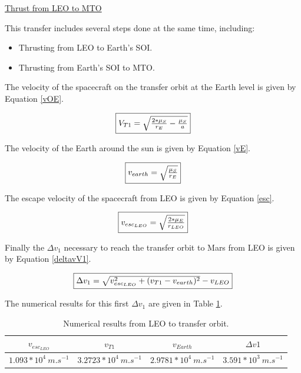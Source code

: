 \documentclass[a4paper, oneside, 11pt]{article}
\begin{document}
\medskip

\underline{Thrust from LEO to MTO}

\medskip

This transfer includes several steps done at the same time, including:
\begin{itemize}
\item Thrusting from LEO to Earth's SOI.
\item Thrusting from Earth's SOI to MTO.
\end{itemize}

The velocity of the spacecraft on the transfer orbit at the Earth level is given by Equation \ref{vOE}.
 
\begin{equation}
\label{vOE}
\fbox{$V_{T1}=\sqrt{\frac{2*\mu_S}{r_E}-\frac{\mu_S}{a}}$}
\end{equation}

The velocity of the Earth around the sun is given by Equation \ref{vE}. 

\begin{equation}
\label{vE}
\fbox{$v_{earth}= \sqrt{\frac{\mu_S}{r_{E}}}$}
\end{equation}

The escape velocity of the spacecraft from LEO is given by Equation \ref{esc}.

\begin{equation}
\label{esc}
\fbox{$v_{esc_{LEO}}= \sqrt{\frac{2*\mu_E}{r_{LEO}}}$}
\end{equation}

Finally the $\Delta v_1$ necessary to reach the transfer orbit to Mars from LEO is given by Equation \ref{deltavV1}.

\begin{equation}
\label{deltavV1}
\fbox{$\Delta v_1= \sqrt{v_{esc_{LEO}}^2+(v_{T1}-v_{earth})^2}-v_{LEO}$}
\end{equation}

The numerical results for this first $\Delta v_1$ are given in Table \ref{deltaV1Tab}.

\begin{table}[!h]
 \caption{Numerical results from LEO to transfer orbit.}
 \label{deltaV1Tab}
\centering
 \begin{tabular}{| c | c |c |c |}
  \hline
 $v_{esc_{LEO}}$ & $v_{T1}$ & $v_{Earth}$ &  $\Delta v1$  \\
     \hline
  $ 1.093*10^4 \SI{}{m.s^{-1}}$  & $ 3.2723*10^4 \SI{}{m.s^{-1}}$ & $ 2.9781*10^4 \SI{}{m.s^{-1}}$ & $ 3.591*10^3 \SI{}{m.s^{-1}}$ \\
     \hline
\end{tabular}
\end{table}
\end{document}
